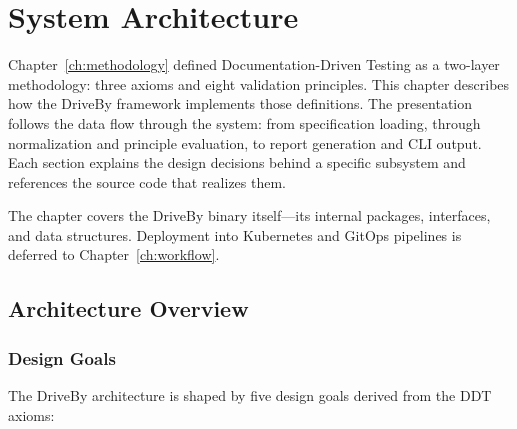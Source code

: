 \chapter{System Architecture}
\label{ch:architecture}

Chapter~\ref{ch:methodology} defined Documentation-Driven Testing as a two-layer methodology: three axioms and eight validation principles. This chapter describes how the DriveBy framework implements those definitions. The presentation follows the data flow through the system: from specification loading, through normalization and principle evaluation, to report generation and CLI output. Each section explains the design decisions behind a specific subsystem and references the source code that realizes them.

The chapter covers the DriveBy binary itself---its internal packages, interfaces, and data structures. Deployment into Kubernetes and GitOps pipelines is deferred to Chapter~\ref{ch:workflow}.

\section{Architecture Overview}
\label{sec:arch-overview}

\subsection{Design Goals}
\label{subsec:design-goals}

The DriveBy architecture is shaped by five design goals derived from the DDT axioms:


